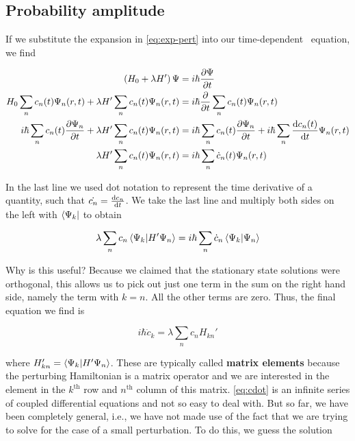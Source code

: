 \subsection{Probability amplitude}

If we substitute the expansion in \autoref{eq:exp-pert} into our time-dependent \Sch\ equation, we find

\begin{align*}
	\left(H_0 + \lambda H'\right)\Psi &= i\hbar \pdv{\Psi}{t} \\
	H_0 \sum_n c_n(t) \Psi_n(r,t) + \lambda H'\sum_n c_n(t) \Psi_n(r,t) &= i\hbar \pdv{t}\sum_n c_n(t) \Psi_n(r,t) \\
	i\hbar\sum_n c_n(t) \pdv{\Psi_n}{t} + \lambda H'\sum_n c_n(t) \Psi_n(r,t) &= i\hbar \sum_n c_n(t) \pdv{\Psi_n}{t} + i\hbar \sum_n \dv{c_n(t)}{t} \Psi_n(r,t) \\
	\lambda H'\sum_n c_n(t) \Psi_n(r,t) &= i\hbar \sum_n \dot{c}_n(t) \Psi_n(r,t)
\end{align*}

In the last line we used dot notation to represent the time derivative of a quantity, such that $\dot{c_n} = \dv{c_n}{t}$. 
We take the last line and multiply both sides on the left with $\bra{\Psi_k}$ to obtain

\begin{equation*}
	\lambda \sum_n c_n \braket{\Psi_k}{H'\Psi_n} = i\hbar \sum_n \dot{c}_n \braket{\Psi_k}{\Psi_n}
\end{equation*}

Why is this useful? 
Because we claimed that the stationary state solutions were orthogonal, this allows us to pick out just one term in the sum on the right hand side, namely the term with $k = n$. 
All the other terms are zero. 
Thus, the final equation we find is

\begin{tcolorbox}[title = Relationship for $c_k$] \vspace{-2ex}
	\begin{equation}
		i\hbar \dot{c}_k = \lambda \sum_n c_n H_{kn}' \label{eq:cdot}
	\end{equation}
\end{tcolorbox}

\noindent where $H_{kn}' = \braket{\Psi_k}{H'\Psi_n}$. 
These are typically called \textbf{matrix elements} because the perturbing Hamiltonian is a matrix operator and we are interested in the element in the $k^{\text{th}}$ row and $n^{\text{th}}$ column of this matrix. 
\autoref{eq:cdot} is an infinite series of coupled differential equations and not so easy to deal with. 
But so far, we have been completely general, i.e., we have not made use of the fact that we are trying to solve for the case of a small perturbation. 
To do this, we guess the solution

